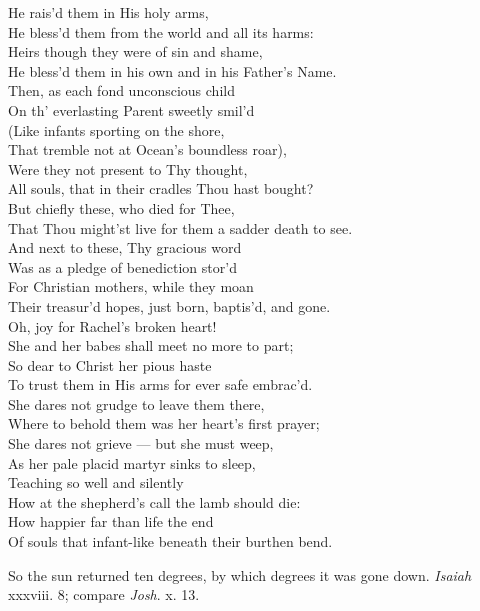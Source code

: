  He rais’d them in His holy arms, \\
 He bless’d them from the world and all its harms: \\
 Heirs though they were of sin and shame, \\
 He bless’d them in his own and in his Father’s Name. \\
  Then, as each fond unconscious child \\
 On th’ everlasting Parent sweetly smil’d \\
 (Like infants sporting on the shore, \\
 That tremble not at Ocean’s boundless roar), \\
 Were they not present to Thy thought, \\
 All souls, that in their cradles Thou hast bought? \\
 But chiefly these, who died for Thee, \\
 That Thou might’st live for them a sadder death to see. \\
  And next to these, Thy gracious word \\
 Was as a pledge of benediction stor’d \\
 For Christian mothers, while they moan \\
 Their treasur’d hopes, just born, baptis’d, and gone. \\
 Oh, joy for Rachel’s broken heart! \\
 She and her babes shall meet no more to part; \\
 So dear to Christ her pious haste \\
 To trust them in His arms for ever safe embrac’d. \\
  She dares not grudge to leave them there, \\
 Where to behold them was her heart’s first prayer; \\
 She dares not grieve — but she must weep, \\
 As her pale placid martyr sinks to sleep, \\
 Teaching so well and silently \\
 How at the shepherd’s call the lamb should die: \\
 How happier far than life the end \\
 Of souls that infant-like beneath their burthen bend.\\


So the sun returned ten degrees, by which degrees it was gone down. \emph{Isaiah} xxxviii. 8; compare \emph{Josh}. x. 13.

